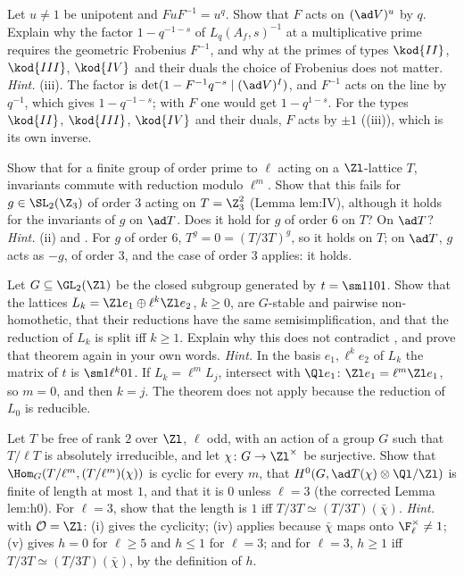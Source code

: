\begin{exercise}\label{ex:reps:ex14}
Let $u\ne1$ be unipotent and $FuF^{-1}=u^q$. Show that $F$ acts on $(\ad V)^u$ by $q$. Explain why the factor $1-q^{-1-s}$ of $L_q(A_f,s)^{-1}$ at a
multiplicative prime requires the geometric Frobenius $F^{-1}$, and why at the primes of types $\kod{II}$, $\kod{III}$, $\kod{IV}$ and their duals the choice of
Frobenius does not matter.
\emph{Hint.} (iii). The factor is $\det(1-F^{-1}q^{-s}\mid(\ad V)^I)$, and $F^{-1}$ acts on the line by $q^{-1}$,
which gives $1-q^{-1-s}$; with $F$ one would get $1-q^{1-s}$. For the types $\kod{II}$, $\kod{III}$, $\kod{IV}$ and their duals, $F$ acts by $\pm1$
((iii)), which is its own inverse.
\end{exercise}

\begin{exercise}\label{ex:reps:ex15}
Show that for a finite group of order prime to $\ell$ acting on a $\Zl$-lattice $T$, invariants commute with reduction modulo $\ell^m$. Show that this
fails for $g\in\SL_2(\Z_3)$ of order $3$ acting on $T=\Z_3^2$ (Lemma lem:IV), although it holds for the invariants of $g$ on $\ad T$. Does it hold for
$g$ of order $6$ on $T$? On $\ad T$?
\emph{Hint.} (ii) and . For $g$ of order $6$, $T^g=0=(T/3T)^g$, so it holds on $T$; on
$\ad T$, $g$ acts as $-g$, of order $3$, and the case of order $3$ applies: it holds.
\end{exercise}

\begin{exercise}\label{ex:reps:ex16}
Let $G\subseteq\GL_2(\Zl)$ be the closed subgroup generated by $t=\sm1101$. Show that the lattices $L_k=\Zl e_1\oplus\ell^k\Zl e_2$, $k\ge0$, are $G$-stable and pairwise
non-homothetic, that their reductions have the same semisimplification, and that the reduction of $L_k$ is split iff $k\ge1$. Explain why this
does not contradict , and prove that theorem again in your own words.
\emph{Hint.} In the basis $e_1,\ell^ke_2$ of $L_k$ the matrix of $t$ is $\sm1{\ell^k}01$. If $L_k=\ell^mL_j$, intersect with $\Ql e_1$: $\Zl e_1=\ell^m\Zl e_1$,
so $m=0$, and then $k=j$. The theorem does not apply because the reduction of $L_0$ is reducible.
\end{exercise}

\begin{exercise}\label{ex:reps:ex17}
Let $T$ be free of rank $2$ over $\Zl$, $\ell$ odd, with an action of a group $G$ such that $T/\ell T$ is absolutely irreducible, and let $\chi\colon G\to\Zl^\times$ be
surjective. Show that $\Hom_G(T/\ell^m,(T/\ell^m)(\chi))$ is cyclic for every $m$, that $H^0(G,\ad T(\chi)\otimes\Ql/\Zl)$ is finite of length at most $1$, and that
it is $0$ unless $\ell=3$ (the corrected Lemma lem:h0). For $\ell=3$, show that the length is $1$ iff $T/3T\simeq(T/3T)(\bar\chi)$.
\emph{Hint.}  with $\mathcal{O}=\Zl$: (i) gives the cyclicity; (iv) applies because $\bar\chi$ maps onto
$\F_\ell^\times\ne1$; (v) gives $h=0$ for $\ell\ge5$ and $h\le1$ for $\ell=3$; and for $\ell=3$, $h\ge1$ iff $T/3T\simeq(T/3T)(\bar\chi)$, by the definition of $h$.
\end{exercise}

